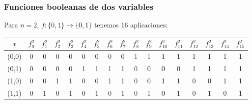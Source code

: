 \subsubsection{Funciones booleanas de dos variables}
Para $n=2$, $f: \{0,1\} \rightarrow \{0,1\}$ tenemos 16 aplicaciones:
\begin{center}
    \begin{tabular}{ |c||c|c|c|c|c|c|c|c|c|c|c|c|c|c|c|c|  }
        \hline
        $x$   & $f_0^2$ & $f_1^2$ & $f_2^2$ & $f_3^2$ & $f_4^2$ & $f_5^2$ & $f_6^2$ & $f_7^2$ & $f_8^2$ & $f_9^2$ & $f_{10}^2$ & $f_{11}^2$ & $f_{12}^2$ & $f_{13}^2$ & $f_{14}^2$ & $f_{15}^2$ \\
        \hline
        (0,0) & 0       & 0       & 0       & 0       & 0       & 0       & 0       & 0       & 1       & 1       & 1          & 1          & 1          & 1          & 1          & 1          \\
        (0,1) & 0       & 0       & 0       & 0       & 1       & 1       & 1       & 1       & 0       & 0       & 0          & 0          & 1          & 1          & 1          & 1          \\
        (1,0) & 0       & 0       & 1       & 1       & 0       & 0       & 1       & 1       & 0       & 0       & 1          & 1          & 0          & 0          & 1          & 1          \\
        (1,1) & 0       & 1       & 0       & 1       & 0       & 1       & 0       & 1       & 0       & 1       & 0          & 1          & 0          & 1          & 0          & 1          \\
        \hline
    \end{tabular}
\end{center}

